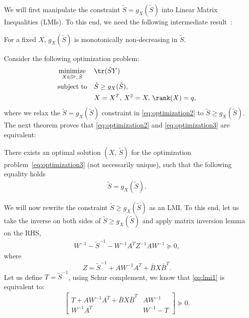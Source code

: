   We will first manipulate the constraint $\tilde S = g_X(\tilde S)$ into  Linear Matrix Inequalities (LMIs). To this end, we need the following intermediate result~\cite{Sinopoli:2004br}:
  \begin{proposition}
    For a fixed $X$, $g_X(\tilde S)$ is monotonically non-decreasing in $\tilde S$.
  \end{proposition}


  Consider the following optimization problem:
  \begin{align}
    &\mathop{\textrm{minimize}}\limits_{X\in\mathbb S^p,\,\tilde S}&
    & \tr(\tilde SY) \label{eq:optimization3}\\
    &\textrm{subject to}&
    &\tilde S \geq g_X(\tilde S), \nonumber\\
    &&
    &X = X^T,\,X^2 = X,\,\rank(X) = q,\nonumber
  \end{align}
  where we relax the $\tilde S = g_X(\tilde S)$ constraint in \eqref{eq:optimization2} to $\tilde S\geq g_X(\tilde S)$. The next theorem proves that \eqref{eq:optimization2} and \eqref{eq:optimization3} are equivalent:
  \begin{lemma}\label{lemma:X}
    There exists an optimal solution $(X,\,\tilde S)$ for the optimization problem~\eqref{eq:optimization3} (not necessarily unique), such that the following equality holds
    \begin{align*}
      \tilde S = g_X(\tilde S).
    \end{align*}
  \end{lemma}

  We will now rewrite the constraint $\tilde S \geq g_X(\tilde S)$ as an LMI. To this end, let us take the inverse on both sides of $\tilde S\geq g_X(\tilde S)$ and apply matrix inversion lemma on the RHS, 
  \begin{align}
    \label{eq:lmi1}
    W^{-1} - \tilde S^{-1} - W^{-1}A^TZ^{-1}AW^{-1}\succeq 0,
  \end{align}
  where
  \begin{displaymath}
    Z = \tilde S^{-1}+AW^{-1}A^T+\bar BX\bar B^T.
  \end{displaymath}
  Let us define $T =\tilde S^{-1}$, using Schur complement, we know that \eqref{eq:lmi1} is equivalent to:
  \begin{align}
    \label{eq:lmi2}
    \begin{bmatrix}
      T+AW^{-1}A^T+\bar BX\bar B^T & AW^{-1}\\
      W^{-1}A^T & W^{-1} - T
    \end{bmatrix} \succeq 0 .
  \end{align}

